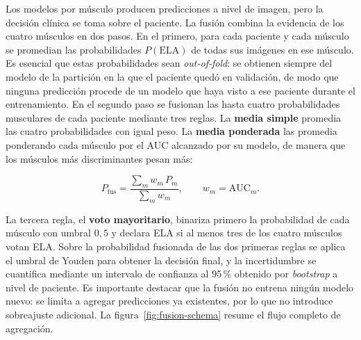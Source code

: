 \documentclass[12pt]{extarticle}
\numberwithin{equation}{section}
\begin{document}
\begin{refsection}
Los modelos por músculo producen predicciones a nivel de imagen, pero la decisión clínica se toma sobre el paciente. La fusión combina la evidencia de los cuatro músculos en dos pasos. En el primero, para cada paciente y cada músculo se promedian las probabilidades $P(\text{ELA})$ de todas sus imágenes en ese músculo. Es esencial que estas probabilidades sean \textit{out-of-fold}: se obtienen siempre del modelo de la partición en la que el paciente quedó en validación, de modo que ninguna predicción procede de un modelo que haya visto a ese paciente durante el entrenamiento. En el segundo paso se fusionan las hasta cuatro probabilidades musculares de cada paciente mediante tres reglas. La \textbf{media simple} promedia las cuatro probabilidades con igual peso. La \textbf{media ponderada} las promedia ponderando cada músculo por el AUC alcanzado por su modelo, de manera que los músculos más discriminantes pesan más:

\begin{equation}
P_{\text{fus}} = \frac{\sum_{m} w_m \, P_m}{\sum_{m} w_m}, \qquad w_m = \text{AUC}_m .
\end{equation}

La tercera regla, el \textbf{voto mayoritario}, binariza primero la probabilidad de cada músculo con umbral $0{,}5$ y declara ELA si al menos tres de los cuatro músculos votan ELA. Sobre la probabilidad fusionada de las dos primeras reglas se aplica el umbral de Youden para obtener la decisión final, y la incertidumbre se cuantifica mediante un intervalo de confianza al 95\,\% obtenido por \textit{bootstrap} a nivel de paciente. Es importante destacar que la fusión no entrena ningún modelo nuevo: se limita a agregar predicciones ya existentes, por lo que no introduce sobreajuste adicional. La figura~\ref{fig:fusion-schema} resume el flujo completo de agregación.


\end{refsection}
\end{document}
